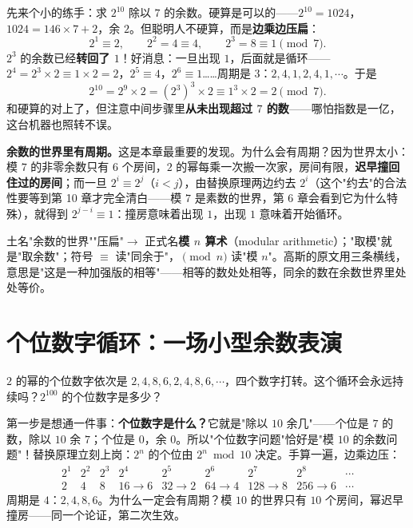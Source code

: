 先来个小的练手：求 $2^{10}$ 除以 $7$ 的余数。硬算是可以的——$2^{10} = 1024$，$1024 = 146\times 7 + 2$，余 $2$。但聪明人不硬算，而是\textbf{边乘边压扁}：
\[
2^1 \equiv 2,\qquad 2^2 = 4 \equiv 4,\qquad 2^3 = 8 \equiv 1 \pmod 7 .
\]
$2^3$ 的余数已经\textbf{转回了 $1$}！好消息：一旦出现 $1$，后面就是循环——$2^4 = 2^3\times 2 \equiv 1\times 2 = 2$，$2^5 \equiv 4$，$2^6 \equiv 1$……周期是 $3$：$2, 4, 1, 2, 4, 1, \cdots$。于是
\[
2^{10} = 2^{9}\times 2 = (2^3)^3 \times 2 \equiv 1^3 \times 2 = 2 \pmod 7 .
\]
和硬算的对上了，但注意中间步骤里\textbf{从未出现超过 $7$ 的数}——哪怕指数是一亿，这台机器也照转不误。

\textbf{余数的世界里有周期。}这是本章最重要的发现。为什么会有周期？因为世界太小：模 $7$ 的非零余数只有 $6$ 个房间，$2$ 的幂每乘一次搬一次家，房间有限，\textbf{迟早撞回住过的房间}；而一旦 $2^i \equiv 2^j$（$i<j$），由替换原理两边约去 $2^i$（这个"约去"的合法性要等到第 10 章才完全清白——模 $7$ 是素数的世界，第 6 章会看到它为什么特殊），就得到 $2^{j-i} \equiv 1$：撞房意味着出现 $1$，出现 $1$ 意味着开始循环。

\begin{cidian}
土名"余数的世界""压扁"$\to$ 正式名\textbf{模 $n$ 算术}（modular arithmetic）；"取模"就是"取余数"；符号 $\equiv$ 读"同余于"，$\pmod n$ 读"模 $n$"。高斯的原文用三条横线，意思是"这是一种加强版的相等"——相等的数处处相等，同余的数在余数世界里处处等价。
\end{cidian}

\section{个位数字循环：一场小型余数表演}

\begin{kaiwei}
$2$ 的幂的个位数字依次是 $2, 4, 8, 6, 2, 4, 8, 6, \cdots$，四个数字打转。这个循环会永远持续吗？$2^{100}$ 的个位数字是多少？
\end{kaiwei}

第一步是想通一件事：\textbf{个位数字是什么？}它就是"除以 $10$ 余几"——个位是 $7$ 的数，除以 $10$ 余 $7$；个位是 $0$，余 $0$。所以"个位数字问题"恰好是"模 $10$ 的余数问题"！替换原理立刻上岗：$2^n$ 的个位由 $2^n \bmod 10$ 决定。手算一遍，边乘边压：
\[
\begin{array}{cccccccccc}
2^1 & 2^2 & 2^3 & 2^4 & 2^5 & 2^6 & 2^7 & 2^8 & \cdots \\
2 & 4 & 8 & 16\to 6 & 32\to 2 & 64\to 4 & 128\to 8 & 256\to 6 & \cdots
\end{array}
\]
周期是 $4$：$2, 4, 8, 6$。为什么一定会有周期？模 $10$ 的世界只有 $10$ 个房间，幂迟早撞房——同一个论证，第二次生效。

